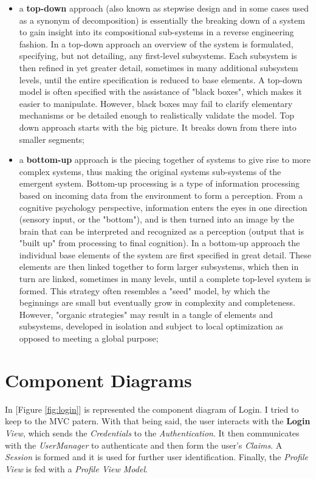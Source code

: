 \documentclass{article}
\begin{document}
			\begin{itemize}
				\item a \textbf{top-down} approach (also known as stepwise design and in some cases used as a synonym of decomposition) is essentially the breaking down of a system to gain insight into its compositional sub-systems in a reverse engineering fashion. In a top-down approach an overview of the system is formulated, specifying, but not detailing, any first-level subsystems. Each subsystem is then refined in yet greater detail, sometimes in many additional subsystem levels, until the entire specification is reduced to base elements. A top-down model is often specified with the assistance of "black boxes", which makes it easier to manipulate. However, black boxes may fail to clarify elementary mechanisms or be detailed enough to realistically validate the model. Top down approach starts with the big picture. It breaks down from there into smaller segments;

				\item a \textbf{bottom-up} approach is the piecing together of systems to give rise to more complex systems, thus making the original systems sub-systems of the emergent system. Bottom-up processing is a type of information processing based on incoming data from the environment to form a perception. From a cognitive psychology perspective, information enters the eyes in one direction (sensory input, or the "bottom"), and is then turned into an image by the brain that can be interpreted and recognized as a perception (output that is "built up" from processing to final cognition). In a bottom-up approach the individual base elements of the system are first specified in great detail. These elements are then linked together to form larger subsystems, which then in turn are linked, sometimes in many levels, until a complete top-level system is formed. This strategy often resembles a "seed" model, by which the beginnings are small but eventually grow in complexity and completeness. However, "organic strategies" may result in a tangle of elements and subsystems, developed in isolation and subject to local optimization as opposed to meeting a global purpose;
			\end{itemize}

	\section{Component Diagrams}
		In [Figure \ref{fig:login}] is represented the component diagram of Login. I tried to keep to the MVC patern. With that being said, the user interacts with the \textbf{Login} \textit{View}, which sends the \textit{Credentials} to the \textit{Authentication}. It then communicates with the \textit{UserManager} to authenticate and then form the user's \textit{Claims}. A \textit{Session} is formed and it is used for further user identification. Finally, the \textit{Profile View} is fed with a \textit{Profile View Model}.
\end{document}
